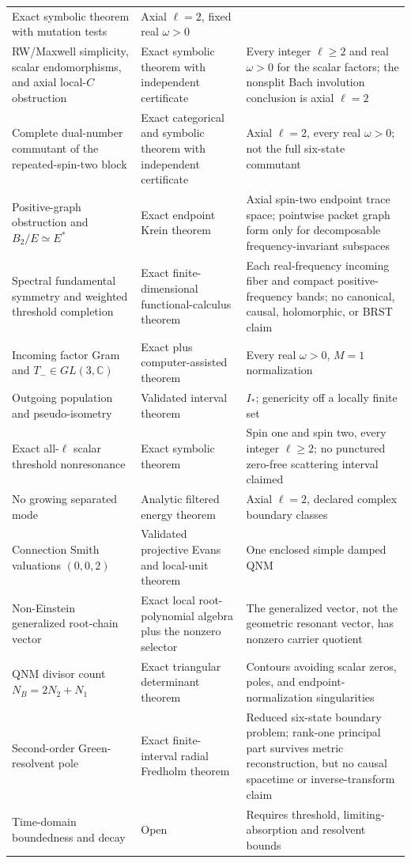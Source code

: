 \documentclass[11pt]{article}
\theoremstyle{definition}
\theoremstyle{remark}
\newcommand{\C}{\mathbb C}
\begin{document}
\begin{longtable}{@{}p{}p{}p{}@{}}
Exact symbolic theorem with mutation tests &
Axial \(\ell=2\), fixed real \(\omega>0\)\\
RW/Maxwell simplicity, scalar endomorphisms, and axial local-\(C\) obstruction &
Exact symbolic theorem with independent certificate &
Every integer \(\ell\ge2\) and real \(\omega>0\) for the scalar factors;
the nonsplit Bach involution conclusion is axial \(\ell=2\)\\
Complete dual-number commutant of the repeated-spin-two block &
Exact categorical and symbolic theorem with independent certificate &
Axial \(\ell=2\), every real \(\omega>0\); not the full six-state commutant\\
Positive-graph obstruction and \(B_2/E\simeq E^*\) &
Exact endpoint Krein theorem &
Axial spin-two endpoint trace space; pointwise packet graph form only for
decomposable frequency-invariant subspaces\\
Spectral fundamental symmetry and weighted threshold completion &
Exact finite-dimensional functional-calculus theorem &
Each real-frequency incoming fiber and compact positive-frequency bands;
no canonical, causal, holomorphic, or BRST claim\\
Incoming factor Gram and \(T_-\in GL(3,\C)\) &
Exact plus computer-assisted theorem &
Every real \(\omega>0\), \(M=1\) normalization\\
Outgoing population and pseudo-isometry &
Validated interval theorem &
\(I_*\); genericity off a locally finite set\\
Exact all-\(\ell\) scalar threshold nonresonance &
Exact symbolic theorem &
Spin one and spin two, every integer \(\ell\ge2\); no punctured zero-free scattering interval claimed\\
No growing separated mode &
Analytic filtered energy theorem &
Axial \(\ell=2\), declared complex boundary classes\\
Connection Smith valuations \((0,0,2)\) &
Validated projective Evans and local-unit theorem &
One enclosed simple damped QNM\\
Non-Einstein generalized root-chain vector &
Exact local root-polynomial algebra plus the nonzero selector &
The generalized vector, not the geometric resonant vector, has nonzero
carrier quotient\\
QNM divisor count \(N_B=2N_2+N_1\) &
Exact triangular determinant theorem &
Contours avoiding scalar zeros, poles, and endpoint-normalization singularities\\
Second-order Green-resolvent pole &
Exact finite-interval radial Fredholm theorem &
Reduced six-state boundary problem; rank-one principal part survives metric
reconstruction, but no causal spacetime or inverse-transform claim\\
Time-domain boundedness and decay &
Open &
Requires threshold, limiting-absorption and resolvent bounds\\
\bottomrule
\end{longtable}
\normalsize
\end{document}
